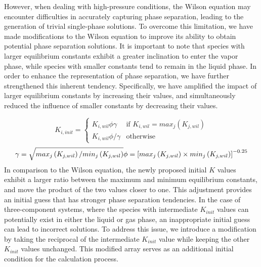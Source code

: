 However, when dealing with high-pressure conditions, the Wilson equation may encounter difficulties in accurately capturing phase separation, leading to the generation of trivial single-phase solutions. To overcome this limitation, we have made modifications to the Wilson equation to improve its ability to obtain potential phase separation solutions. It is important to note that species with larger equilibrium constants exhibit a greater inclination to enter the vapor phase, while species with smaller constants tend to remain in the liquid phase. In order to enhance the representation of phase separation, we have further strengthened this inherent tendency. Specifically, we have amplified the impact of larger equilibrium constants by increasing their values, and simultaneously reduced the influence of smaller constants by decreasing their values.

\begin{equation} 
K_{i,init} = 
\begin{cases}
 K_{i,wil}\phi\gamma  &\text{if }  K_{i,wil} = max_j \left(K_{j,wil}\right) \\
 K_{i,wil}\phi/\gamma & \text{otherwise} 
\end{cases}  
\end{equation}
\begin{equation}
\gamma = \sqrt{max_j \left(K_{j,wil}\right) / min_j \left(K_{j,wil}\right)}\\
\phi = \left[max_j \left(K_{j,wil}\right) \times min_j \left(K_{j,wil}\right)\right]^{-0.25}
\end{equation}
In comparison to the Wilson equation, the newly proposed initial $K$ values exhibit a larger ratio between the maximum and minimum equilibrium constants, and move the product of the two values closer to one. This adjustment provides an initial guess that has stronger phase separation tendencies.
In the case of three-component systems, where the species with intermediate $K_{init}$ values can potentially exist in either the liquid or gas phase, an inappropriate initial guess can lead to incorrect solutions. To address this issue, we introduce a modification by taking the reciprocal of the intermediate $K_{init}$ value while keeping the other $K_{init}$ values unchanged. This modified array serves as an additional initial condition for the calculation process.

